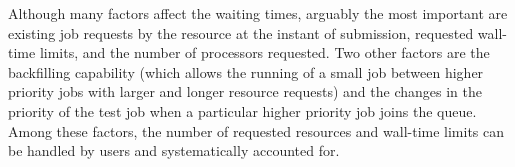 \documentclass[preprint,12pt]{elsarticle}
\begin{document}

Although many factors affect the waiting times, arguably the most important are existing job requests by the resource at the instant of submission, requested wall-time limits, and the number of processors requested. Two other factors are the backfilling capability (which allows the running of a small job between higher priority jobs with larger and longer resource requests) and the changes in the priority of the test job when a particular higher priority job joins the queue. Among these factors, the number of requested resources and wall-time limits can be handled by users and systematically accounted for.

\end{document}
